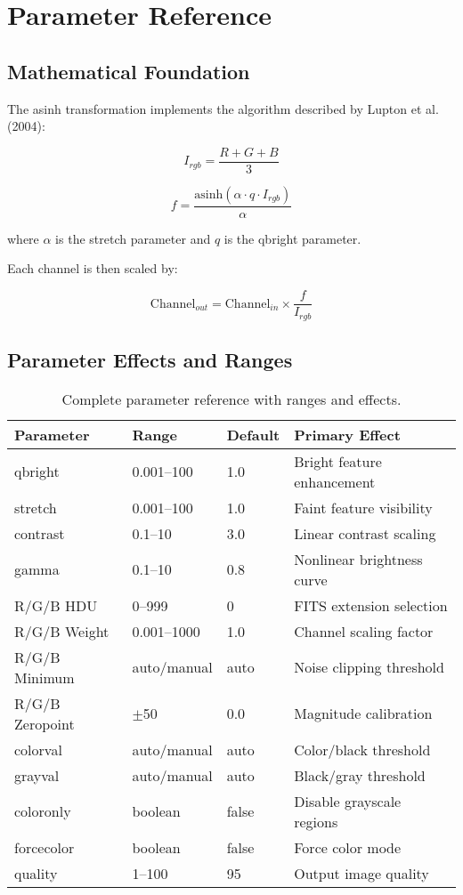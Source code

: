 \documentclass[11pt,a4paper]{article}
\begin{document}
\section{Parameter Reference}

\subsection{Mathematical Foundation}

The asinh transformation implements the algorithm described by Lupton et al.
(2004):

\begin{equation}
I_{rgb} = \frac{R + G + B}{3}
\end{equation}

\begin{equation}
f = \frac{\text{asinh}(\alpha \cdot q \cdot I_{rgb})}{\alpha}
\end{equation}

where $\alpha$ is the stretch parameter and $q$ is the qbright parameter.

Each channel is then scaled by:

\begin{equation}
\text{Channel}_{out} = \text{Channel}_{in} \times \frac{f}{I_{rgb}}
\end{equation}

\subsection{Parameter Effects and Ranges}

\begin{table}[H]
\centering
\begin{tabular}{@{}llll@{}}
\toprule
Parameter & Range & Default & Primary Effect \\
\midrule
qbright & 0.001--100 & 1.0 & Bright feature enhancement \\
stretch & 0.001--100 & 1.0 & Faint feature visibility \\
contrast & 0.1--10 & 3.0 & Linear contrast scaling \\
gamma & 0.1--10 & 0.8 & Nonlinear brightness curve \\
R/G/B HDU & 0--999 & 0 & FITS extension selection \\
R/G/B Weight & 0.001--1000 & 1.0 & Channel scaling factor \\
R/G/B Minimum & auto/manual & auto & Noise clipping threshold \\
R/G/B Zeropoint & $\pm$50 & 0.0 & Magnitude calibration \\
colorval & auto/manual & auto & Color/black threshold \\
grayval & auto/manual & auto & Black/gray threshold \\
coloronly & boolean & false & Disable grayscale regions \\
forcecolor & boolean & false & Force color mode \\
quality & 1--100 & 95 & Output image quality \\
\bottomrule
\end{tabular}
\caption{Complete parameter reference with ranges and effects.}
\label{tab:parameters}
\end{table}
\end{document}
